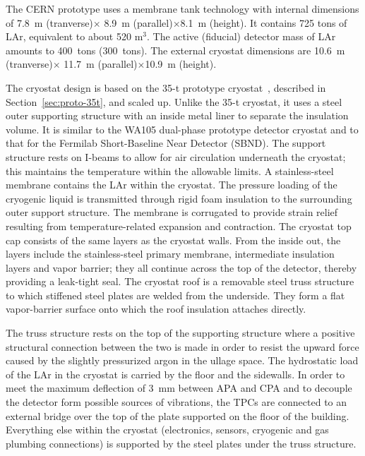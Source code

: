 The %
CERN prototype uses a membrane tank technology with internal dimensions of
7.8~m (tranverse)$\times$ 8.9~m (parallel)$\times$8.1~m (height).
It contains  725 tons of LAr, equivalent to about 520 m$^3$. The active (fiducial) detector mass of LAr amounts to 400~tons (300~tons). 
The external cryostat dimensions are 10.6~m (tranverse)$\times$ 11.7~m (parallel)$\times$10.9~m (height).

The cryostat design is based on %
the 35-t prototype cryostat~\cite{montanari_35ton}, described in Section~\ref{sec:proto-35t}, and scaled up.
Unlike the 35-t cryostat, it uses a steel outer supporting structure with an inside metal liner to 
separate the insulation volume.  It is similar to the WA105 dual-phase prototype detector cryostat and to that for the Fermilab Short-Baseline Near Detector (SBND).  The support structure rests on I-beams to allow for air circulation underneath the cryostat; this maintains the temperature within the allowable limits.
A stainless-steel membrane contains the LAr within the cryostat. The pressure loading of the cryogenic liquid is transmitted through rigid foam insulation to the surrounding outer support structure. The membrane is corrugated to provide strain relief resulting from temperature-related expansion and contraction. The cryostat top cap consists of the same layers as the cryostat walls. %
%
From the inside out, the layers include 
the stainless-steel primary membrane, intermediate insulation layers and vapor barrier; they all continue across
the top of the detector, thereby providing a leak-tight seal.
The cryostat roof is a removable steel truss structure
to which stiffened steel plates are welded from the
underside. They form a flat vapor-barrier surface onto which the roof insulation attaches directly.


The truss structure rests on the top of the supporting structure where a positive structural connection
between the two is made in order to resist the upward force caused by the slightly pressurized argon in the ullage
space. The hydrostatic load of the LAr in the cryostat is carried by the floor and the sidewalls. In order to meet the maximum deflection of 3~mm between APA and CPA and to decouple the detector form possible sources of vibrations, the TPCs are connected to an external bridge over the top of the plate supported on the floor of the building. Everything else within the cryostat
(electronics, sensors, cryogenic and gas plumbing connections) is
supported by the steel plates under the truss structure.

